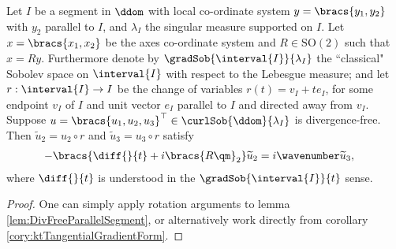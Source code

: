 \begin{prop} \label{prop:DivFreeGeneralSegment}
	Let $I$ be a segment in $\ddom$ with local co-ordinate system $y=\bracs{y_1,y_2}$ with $y_2$ parallel to $I$, and $\lambda_I$ the singular measure supported on $I$.
	Let $x=\bracs{x_1,x_2}$ be the axes co-ordinate system and $R\in\mathrm{SO}(2)$ such that $x=Ry$.
	Furthermore denote by $\gradSob{\interval{I}}{\lambda_I}$ the ``classical" Sobolev space on $\interval{I}$ with respect to the Lebesgue measure; and let $r:\interval{I}\rightarrow I$ be the change of variables $r(t)= v_I + t e_I$, for some endpoint $v_I$ of $I$ and unit vector $e_I$ parallel to $I$ and directed away from $v_I$.
	Suppose $u=\bracs{u_1, u_2, u_3}^\top\in\curlSob{\ddom}{\lambda_I}$ is divergence-free.
	Then $\widetilde{u}_2 = u_2 \circ r$ and $\widetilde{u}_3 = u_3 \circ r$ satisfy
	\begin{align*}
		-\bracs{\diff{}{t} + i\bracs{R\qm}_2}\widetilde{u}_2 &= i\wavenumber\widetilde{u}_3,
	\end{align*}
	where $\diff{}{t}$ is understood in the $\gradSob{\interval{I}}{t}$ sense.
\end{prop}
\begin{proof}
	One can simply apply rotation arguments to lemma \ref{lem:DivFreeParallelSegment}, or alternatively work directly from corollary \ref{cory:ktTangentialGradientForm}.
\end{proof}

